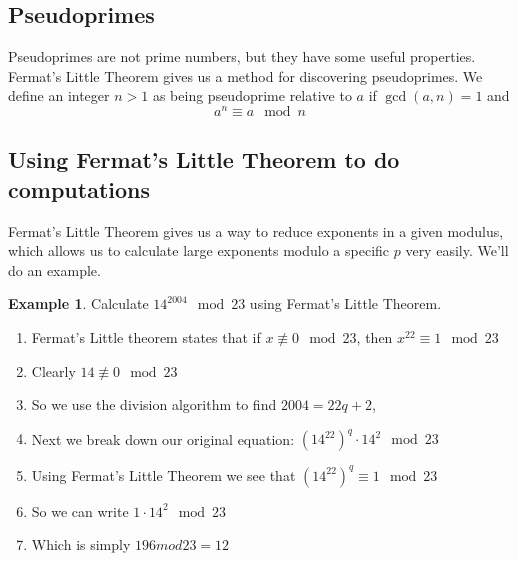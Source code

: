 \documentclass[10pt]{article}
\theoremstyle{definition}
\newtheorem{ex}[theorem]{Example}
\theoremstyle{remark}
\begin{document}
\subsection{Pseudoprimes}
Pseudoprimes are not prime numbers, but they have some useful properties.  Fermat's Little Theorem gives us a method for discovering pseudoprimes.  We define an integer $n > 1$ as being pseudoprime relative to $a$ if $\gcd(a,n)=1$ and $$a^n \equiv a \mod n$$
\subsection{Using Fermat's Little Theorem to do computations}
Fermat's Little Theorem gives us a way to reduce exponents in a given modulus, which allows us to calculate large exponents modulo a specific $p$ very easily.  We'll do an example.
\begin{ex}
Calculate $14^{2004} \mod 23$ using Fermat's Little Theorem.
\begin{enumerate}
\item Fermat's Little theorem states that if $x \not\equiv 0 \mod 23$, then $x^{22} \equiv 1 \mod 23$
\item Clearly $14 \not\equiv 0 \mod 23$
\item So we use the division algorithm to find $2004 = 22q + 2$, 
\item Next we break down our original equation: $(14^{22})^q \cdot 14^2 \mod 23$
\item Using Fermat's Little Theorem we see that $(14^{22})^q \equiv 1 \mod 23 $
\item So we can write $1 \cdot 14^2 \mod 23$
\item Which is simply $196 mod 23 = 12$
\end{enumerate}
\end{ex}
\end{document}
